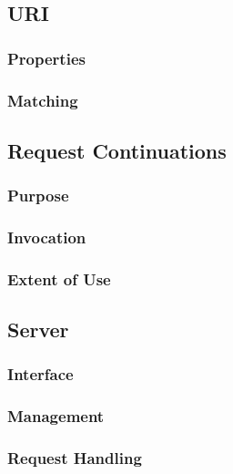\subsection{URI}
\subsubsection{Properties}
\subsubsection{Matching}

\subsection{Request Continuations}
\subsubsection{Purpose}
\subsubsection{Invocation}
\subsubsection{Extent of Use}

\subsection{Server}
\subsubsection{Interface}
\subsubsection{Management}
\subsubsection{Request Handling}

